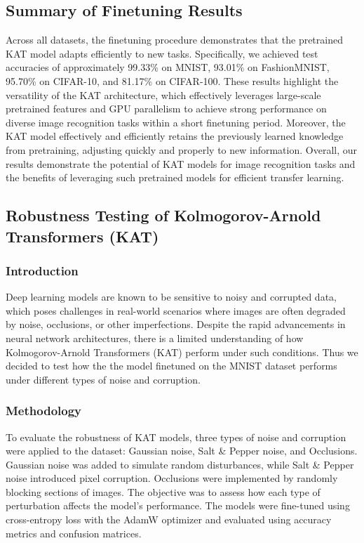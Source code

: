 \documentclass[conference]{IEEEtran}
\begin{document}
\subsection{Summary of Finetuning Results}

Across all datasets, the finetuning procedure demonstrates that the pretrained
KAT model adapts efficiently to new tasks. Specifically, we achieved test
accuracies of approximately 99.33\% on MNIST, 93.01\% on FashionMNIST, 95.70\%
on CIFAR-10, and 81.17\% on CIFAR-100. These results highlight the versatility
of the KAT architecture, which effectively leverages large-scale pretrained
features and GPU parallelism to achieve strong performance on diverse image
recognition tasks within a short finetuning period. Moreover, the KAT model
effectively and efficiently retains the previously learned knowledge from
pretraining, adjusting quickly and properly to new information. Overall, our
results demonstrate the potential of KAT models for image recognition tasks and
the benefits of leveraging such pretrained models for efficient transfer
learning.

\subsection{Robustness Testing of Kolmogorov-Arnold Transformers (KAT)}

\subsubsection{Introduction}

Deep learning models are known to be sensitive to noisy and corrupted data,
which poses challenges in real-world scenarios where images are often degraded
by noise, occlusions, or other imperfections. Despite the rapid advancements in
neural network architectures, there is a limited understanding of how
Kolmogorov-Arnold Transformers (KAT) perform under such conditions. Thus we
decided to test how the the model finetuned on the MNIST dataset performs under
different types of noise and corruption.

\subsubsection{Methodology}

To evaluate the robustness of KAT models, three types of noise and corruption
were applied to the dataset: Gaussian noise, Salt \& Pepper noise, and
Occlusions. Gaussian noise was added to simulate random disturbances, while
Salt \& Pepper noise introduced pixel corruption. Occlusions were implemented
by randomly blocking sections of images. The objective was to assess how each
type of perturbation affects the model's performance. The models were
fine-tuned using cross-entropy loss with the AdamW optimizer and evaluated
using accuracy metrics and confusion matrices.
\end{document}
